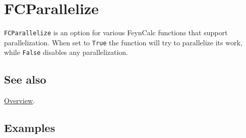 \documentclass[../FeynCalcManual.tex]{subfiles}
\begin{document}
\hypertarget{fcparallelize}{
\section{FCParallelize}\label{fcparallelize}}

\texttt{FCParallelize} is an option for various FeynCalc functions that
support parallelization. When set to \texttt{True} the function will try
to parallelize its work, while \texttt{False} disables any
parallelization.

\subsection{See also}

\hyperlink{toc}{Overview}.

\subsection{Examples}
\end{document}
